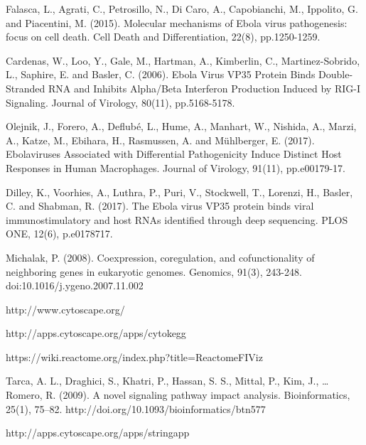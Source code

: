 \documentclass[twocolumn]{article}
\begin{document}
\begin{thebibliography}{9}
	Falasca, L., Agrati, C., Petrosillo, N., Di Caro, A., Capobianchi, M., Ippolito, G. and Piacentini, M. (2015).
	 Molecular mechanisms of Ebola virus pathogenesis: focus on cell death. Cell Death and Differentiation, 22(8), pp.1250-1259.
	 
	Cardenas, W., Loo, Y., Gale, M., Hartman, A., Kimberlin, C., Martinez-Sobrido, L., Saphire, E. and Basler, C. (2006). Ebola Virus VP35 Protein Binds Double-Stranded RNA and Inhibits Alpha/Beta Interferon Production Induced by RIG-I Signaling. Journal of Virology, 80(11), pp.5168-5178.
	
	Olejnik, J., Forero, A., Deflubé, L., Hume, A., Manhart, W., Nishida, A., Marzi, A., Katze, M., Ebihara, H., Rasmussen, A. and Mühlberger, E. (2017). Ebolaviruses Associated with Differential Pathogenicity Induce Distinct Host Responses in Human Macrophages. Journal of Virology, 91(11), pp.e00179-17.
	
	Dilley, K., Voorhies, A., Luthra, P., Puri, V., Stockwell, T., Lorenzi, H., Basler, C. and Shabman, R. (2017). The Ebola virus VP35 protein binds viral immunostimulatory and host RNAs identified through deep sequencing. PLOS ONE, 12(6), p.e0178717.
	

	Michalak, P. (2008). Coexpression, coregulation, and cofunctionality of neighboring genes in eukaryotic genomes. Genomics, 91(3), 243-248. doi:10.1016/j.ygeno.2007.11.002 
	
	http://www.cytoscape.org/
	
	http://apps.cytoscape.org/apps/cytokegg
	
	https://wiki.reactome.org/index.php?title=ReactomeFIViz
	
	Tarca, A. L., Draghici, S., Khatri, P., Hassan, S. S., Mittal, P., Kim, J., … Romero, R. (2009). A novel signaling pathway impact analysis. Bioinformatics, 25(1), 75–82. http://doi.org/10.1093/bioinformatics/btn577
	
	http://apps.cytoscape.org/apps/stringapp
	
	
\end{thebibliography}
\end{document}
